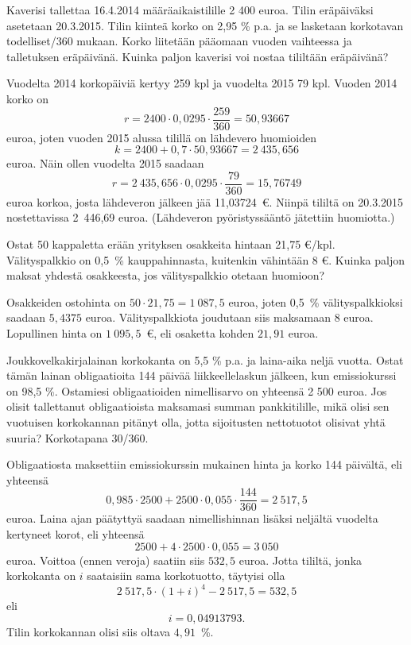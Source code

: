 \documentclass{article}\usepackage[]{graphicx}\usepackage[]{color}
\begin{document}
\begin{question} 
    Kaverisi tallettaa 16.4.2014 määräaikaistilille 2 400 euroa. Tilin eräpäiväksi asetetaan 20.3.2015. Tilin kiinteä korko on 2{,}95 \% p.a. ja se lasketaan korkotavan todelliset/360 mukaan. Korko liitetään pääomaan vuoden vaihteessa ja talletuksen eräpäivänä. Kuinka paljon kaverisi voi nostaa tililtään eräpäivänä?
\end{question}
\begin{solution}
    Vuodelta 2014 korkopäiviä kertyy 259 kpl ja vuodelta 2015 79 kpl. Vuoden 2014 korko on
    \[
        r = 2400\cdot 0,0295\cdot \frac{259}{360} = 50{,}93667
    \]
    euroa, joten vuoden 2015 alussa tilillä on lähdevero huomioiden 
    \[
        k = 2400 + 0,7\cdot50{,}93667 = 2~435{,}656
    \]
    euroa. Näin ollen vuodelta 2015 saadaan
    \[
        r = 2~435{,}656\cdot0,0295\cdot\frac{79}{360} = 15{,}76749
    \]
    euroa korkoa, josta lähdeveron jälkeen jää 11{,}03724\ \euro. Niinpä tililtä on 20.3.2015 nostettavissa 2~446{,}69 euroa. (Lähdeveron pyöristyssääntö jätettiin huomiotta.)
\end{solution}

\begin{question} 
    Ostat 50 kappaletta erään yrityksen osakkeita hintaan 21{,}75 \euro/kpl. Välityspalkkio on 0{,}5~\% kauppahinnasta, kuitenkin vähintään 8 \euro. Kuinka paljon maksat yhdestä osakkeesta, jos välityspalkkio otetaan huomioon?
\end{question}
\begin{solution}
    Osakkeiden ostohinta on \(50\cdot21,75 = 1~087{,}5\) euroa, joten 0,5~\% välityspalkkioksi saadaan \(5{,}4375\) euroa. Välityspalkkiota joudutaan siis maksamaan 8 euroa. Lopullinen hinta on \(1~095{,}5\)~\euro, eli osaketta kohden \(21{,}91\) euroa.
\end{solution}

\begin{question} 
    Joukkovelkakirjalainan korkokanta on 5{,}5 \% p.a. ja laina-aika neljä vuotta. Ostat tämän lainan obligaatioita 144 päivää liikkeellelaskun jälkeen, kun emissiokurssi on 98{,}5 \%. Ostamiesi obligaatioiden nimellisarvo on yhteensä 2 500 euroa. Jos olisit tallettanut obligaatioista maksamasi summan pankkitilille, mikä olisi sen vuotuisen korkokannan pitänyt olla, jotta sijoitusten nettotuotot olisivat yhtä suuria? Korkotapana 30/360.
\end{question}
\begin{solution}
    Obligaatiosta maksettiin emissiokurssin mukainen hinta ja korko 144 päivältä, eli yhteensä 
    \[
        0,985\cdot2500 + 2500\cdot0,055\cdot\frac{144}{360} = 2~517{,}5
    \]
    euroa. Laina ajan päätyttyä saadaan nimellishinnan lisäksi neljältä vuodelta kertyneet korot, eli yhteensä
    \[
       2500 + 4\cdot 2500 \cdot 0,055 = 3~050
    \]
    euroa. Voittoa (ennen veroja) saatiin siis \(532{,}5\) euroa. Jotta tililtä, jonka korkokanta on \(i\) saataisiin sama korkotuotto, täytyisi olla
    \[
        2~517{,}5\cdot (1+i)^4 - 2~517{,}5 = 532{,}5
    \]
    eli
    \[
        i = 0{,}04913793.
    \]
    Tilin korkokannan olisi siis oltava \(4{,}91\)~\%.
\end{solution}
\end{document}
